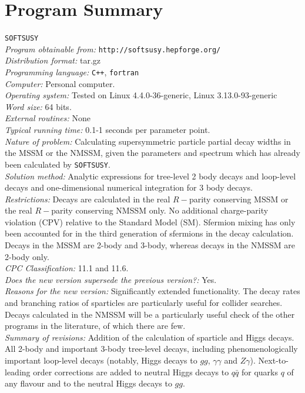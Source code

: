 \documentclass[final,3p,times]{elsarticle}
\def\SOFTSUSY{{\tt SOFTSUSY}}
\begin{document}
\section{Program Summary}
 \SOFTSUSY{} \\
{\em Program obtainable   from:} {\tt http://softsusy.hepforge.org/} \\
{\em Distribution format:}\/ tar.gz \\
{\em Programming language:} {\tt C++}, {\tt fortran} \\
{\em Computer:}\/ Personal computer. \\
{\em Operating system:}\/ Tested on Linux 4.4.0-36-generic, Linux 3.13.0-93-generic
\\
{\em Word size:}\/ 64 bits. \\
{\em External routines:}\/ None \\
{\em Typical running time:}\/ 0.1-1 seconds per parameter point. \\
{\em Nature of problem:}\/ Calculating supersymmetric particle partial decay
widths in the 
MSSM or the NMSSM\@, given the parameters and spectrum which has already been
calculated by \SOFTSUSY{}. \\
{\em Solution method:}\/ Analytic expressions for tree-level 2 body decays and loop-level decays and
one-dimensional numerical integration for 3 body decays.\\
{\em Restrictions:}\/ Decays are calculated in the real $R-$parity conserving
MSSM  or the real $R-$parity conserving
NMSSM only. No additional charge-parity violation (CPV) relative to the
Standard Model (SM). Sfermion mixing has only been accounted for in the third
generation of sfermions in the decay calculation. Decays in the MSSM are
2-body and 3-body, whereas decays in the NMSSM are 2-body only. \\
{\em CPC Classification:}\/ 11.1 and 11.6. \\
{\em Does the new version supersede the previous version?:}\/ Yes. \\
{\em Reasons for the new version:}\/ Significantly extended functionality. The
decay rates and branching ratios of sparticles are particularly useful for
collider searches. Decays calculated in the NMSSM will be a particularly
useful check of the other programs in the literature, of which there are few.\\
{\em Summary of revisions:}\/
Addition of the calculation of sparticle and Higgs decays. 
All 2-body and important 3-body tree-level
decays, including phenomenologically important loop-level decays (notably,
Higgs decays to $gg$, $\gamma \gamma$ and $Z \gamma$). Next-to-leading order corrections
are added to neutral Higgs  decays to $q \bar q$ for quarks $q$ of any flavour and to the neutral Higgs
decays to $gg$.
\end{document}
